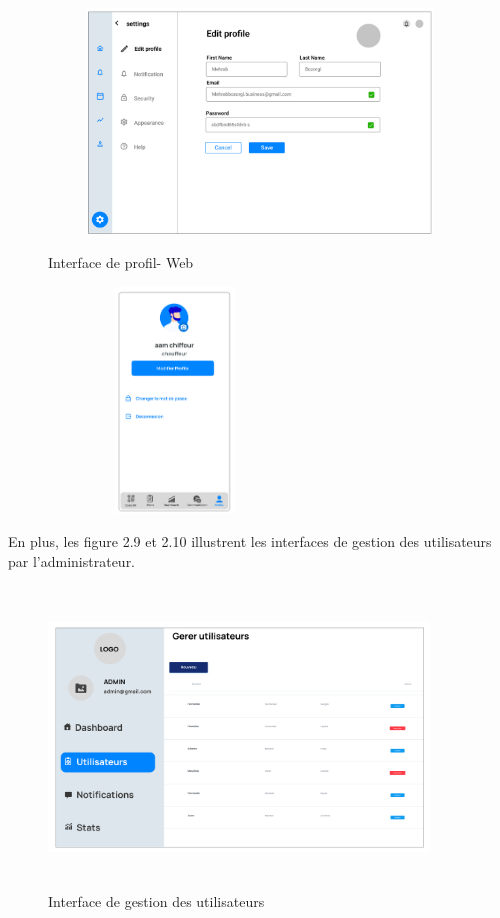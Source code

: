 \begin{figure}[h!]
  \centering
  \begin{minipage}[t]{0.60\textwidth}
    \centering
    \includegraphics[width=1\textwidth, height=6cm]{chap2.images/prot modifer web.png}
    \caption{Interface de profil- Web}
  \end{minipage}
  \hfill
  \begin{minipage}[t]{0.38\textwidth}
    \centering
    \includegraphics[width=0.6\textwidth, height=6cm]{chap2.images/prot modifier mob.png}
    \caption{}
  \end{minipage}
\end{figure}

\vspace{1cm}
En plus, les figure 2.9 et 2.10 illustrent les interfaces de gestion des utilisateurs par l'administrateur.
\begin{figure}[h!]
  \centering
  \includegraphics[width=0.9\textwidth, height=8cm]{chap2.images/prot gestion user.png}
  \caption{Interface de gestion des utilisateurs}
\end{figure}

